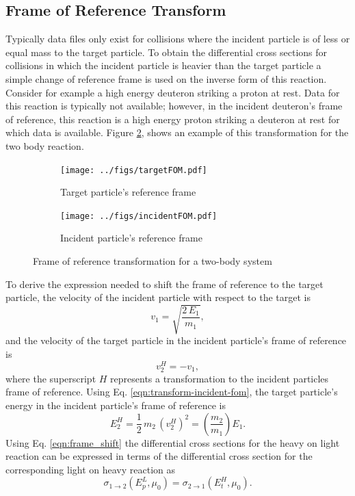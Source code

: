 \subsection{Frame of Reference Transform}
Typically data files only exist for collisions where the incident particle is of less or equal mass to the target particle. To obtain the differential cross sections for collisions in which the incident particle is heavier than the target particle a simple change of reference frame is used on the inverse form of this reaction. Consider for example a high energy deuteron striking a proton at rest. Data for this reaction is typically not available; however, in the incident deuteron's frame of reference, this reaction is a high energy proton striking a deuteron at rest for which data is available. Figure \ref{fig:heavy_collisions}, shows an example of this transformation for the two body reaction.
\begin{figure}[!htb]
  \centering
  \begin{subfigure}{.45\textwidth}
    \centering
    \texttt{[image: ../figs/targetFOM.pdf]}
    \caption{Target particle's reference frame}
  \end{subfigure}%
  \begin{subfigure}{.45\textwidth}
    \centering
    \texttt{[image: ../figs/incidentFOM.pdf]}
    \caption{Incident particle's reference frame}
    \label{fig:sub2}
  \end{subfigure}
  \caption{Frame of reference transformation for a two-body system}
  \label{fig:heavy_collisions}
\end{figure}

To derive the expression needed to shift the frame of reference to the target particle, the velocity of the incident particle with respect to the target is
\begin{equation}
    v_1 = \sqrt{\dfrac{2 \, E_1}{m_1}},
\end{equation}
and the velocity of the target particle in the incident particle's frame of reference is
\begin{equation} \label{eqn:transform-incident-fom}
    v_2^H = -v_1,
\end{equation}
where the superscript $H$ represents a transformation to the incident particles frame of reference. Using Eq. \eqref{eqn:transform-incident-fom}, the target particle's energy in the incident particle's frame of reference is
\begin{equation} \label{eqn:frame_shift}
    E_2^H = \dfrac{1}{2} \, m_2 \, (v_2^H)^2 = \left( \dfrac{m_2}{m_1} \right) E_1.
\end{equation}
Using Eq. \ref{eqn:frame_shift} the differential cross sections for the heavy on light reaction can be expressed in terms of the differential cross section for the corresponding light on heavy reaction as
\begin{equation}
  \sigma_{1 \rightarrow 2}(E_p^L,\mu_0) = \sigma_{2 \rightarrow 1}(E_t^H,\mu_0).
\end{equation}


